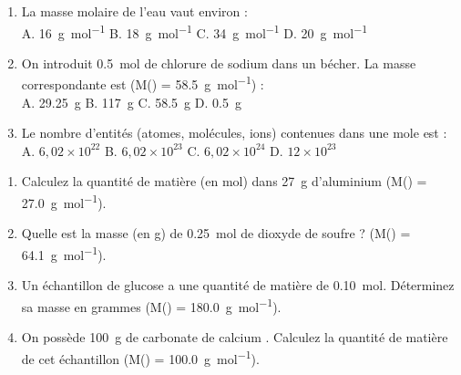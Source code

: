 \documentclass[11pt]{article}
\begin{document}
\begin{exercice}
\begin{enumerate}
    \item La masse molaire de l'eau  vaut environ :\\
    A. \SI{16}{g.mol^{-1}} \quad B. \SI{18}{g.mol^{-1}} \quad C. \SI{34}{g.mol^{-1}} \quad D. \SI{20}{g.mol^{-1}}
    \item On introduit \SI{0,5}{mol} de chlorure de sodium  dans un bécher. La masse correspondante est (M() = \SI{58,5}{g.mol^{-1}}) :\\
    A. \SI{29,25}{g} \quad B. \SI{117}{g} \quad C. \SI{58,5}{g} \quad D. \SI{0,5}{g}
    \item Le nombre d'entités (atomes, molécules, ions) contenues dans une mole est :\\
    A. $6,02 \times 10^{22}$ \quad B. $6,02 \times 10^{23}$ \quad C. $6,02 \times 10^{24}$ \quad D. $12 \times 10^{23}$
\end{enumerate}
\end{exercice}

\begin{exercice}[Calculs de quantité de matière : $n = m/M$]
\begin{enumerate}
    \item Calculez la quantité de matière (en mol) dans \SI{27}{g} d'aluminium (M() = \SI{27,0}{g.mol^{-1}}).
    \item Quelle est la masse (en g) de \SI{0,25}{mol} de dioxyde de soufre  ? (M() = \SI{64,1}{g.mol^{-1}}).
    \item Un échantillon de glucose  a une quantité de matière de \SI{0,10}{mol}. Déterminez sa masse en grammes (M() = \SI{180,0}{g.mol^{-1}}).
    \item On possède \SI{100}{g} de carbonate de calcium . Calculez la quantité de matière de cet échantillon (M() = \SI{100,0}{g.mol^{-1}}).
\end{enumerate}
\end{exercice}
\end{document}
